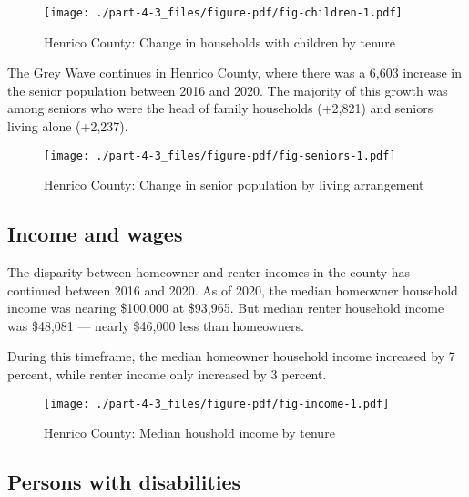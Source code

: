 \documentclass[
  letterpaper,
  DIV=11,
  numbers=noendperiod]{scrreprt}
\begin{document}
\begin{figure}

{\centering \texttt{[image: ./part-4-3\_files/figure-pdf/fig-children-1.pdf]}

}

\caption{\label{fig-children}Henrico County: Change in households with
children by tenure}

\end{figure}

The Grey Wave continues in Henrico County, where there was a 6,603
increase in the senior population between 2016 and 2020. The majority of
this growth was among seniors who were the head of family households
(+2,821) and seniors living alone (+2,237).

\begin{figure}

{\centering \texttt{[image: ./part-4-3\_files/figure-pdf/fig-seniors-1.pdf]}

}

\caption{\label{fig-seniors}Henrico County: Change in senior population
by living arrangement}

\end{figure}

\hypertarget{income-and-wages-2}{%
\subsection{Income and wages}\label{income-and-wages-2}}

The disparity between homeowner and renter incomes in the county has
continued between 2016 and 2020. As of 2020, the median homeowner
household income was nearing \$100,000 at \$93,965. But median renter
household income was \$48,081 --- nearly \$46,000 less than homeowners.

During this timeframe, the median homeowner household income increased
by 7 percent, while renter income only increased by 3 percent.

\begin{figure}

{\centering \texttt{[image: ./part-4-3\_files/figure-pdf/fig-income-1.pdf]}

}

\caption{\label{fig-income}Henrico County: Median houshold income by
tenure}

\end{figure}

\hypertarget{persons-with-disabilities-2}{%
\subsection{Persons with
disabilities}\label{persons-with-disabilities-2}}
\end{document}

